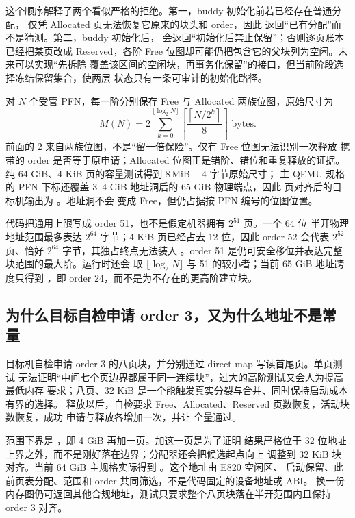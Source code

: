 这个顺序解释了两个看似严格的拒绝。第一，buddy 初始化前若已经存在普通分配，
仅凭 Allocated 页无法恢复它原来的块头和 order，因此
 返回“已有分配”而不是猜测。第二，buddy 初始化后，
 会返回“初始化后禁止保留”；否则逐页账本已经把某页改成
Reserved，各阶 Free 位图却可能仍把包含它的父块列为空闲。未来可以实现“先拆除
覆盖该区间的空闲块，再事务化保留”的接口，但当前阶段选择冻结保留集合，使两层
状态只有一条可审计的初始化路径。

对 \(N\) 个受管 PFN，每一阶分别保存 Free 与 Allocated 两族位图，原始尺寸为
\[
  M(N)=2\sum_{k=0}^{\lfloor\log_2N\rfloor}
  \left\lceil\frac{\left\lceil N/2^k\right\rceil}{8}\right\rceil
  \text{ bytes}.
\]
前面的 2 来自两族位图，不是“留一倍保险”。仅有 Free 位图无法识别一次释放
携带的 order 是否等于原申请；Allocated 位图正是错阶、错位和重复释放的证据。
纯 64 GiB、4 KiB 页的容量测试得到 \(8\,\mathrm{MiB}+4\) 字节原始尺寸；
主 QEMU 规格的 PFN 下标还覆盖 3--4 GiB 地址洞后的 65 GiB 物理端点，因此
页对齐后的目标机输出为 。地址洞不会
变成 Free，但仍占据按 PFN 编号的位图位置。

代码把通用上限写成 order 51，也不是假定机器拥有 \(2^{51}\) 页。一个 64 位
半开物理地址范围最多表达 \(2^{64}\) 字节；4 KiB 页已经占去 12 位，因此
order 52 会代表 \(2^{52}\) 页、恰好 \(2^{64}\) 字节，其独占终点无法装入
。order 51 是仍可安全移位并表达完整块范围的最大阶。运行时还会
取 \(\lfloor\log_2N\rfloor\) 与 51 的较小者；当前 65 GiB 地址跨度只得到
，即 order 24，而不是为不存在的更高阶建立块。

\subsection{为什么目标自检申请 order 3，又为什么地址不是常量}

目标机自检申请 order 3 的八页块，并分别通过 direct map 写读首尾页。单页测试
无法证明“中间七个页边界都属于同一连续块”，过大的高阶测试又会人为提高最低内存
要求；八页、32 KiB 是一个能触发真实分裂与合并、同时保持启动成本有界的选择。
释放以后，自检要求 Free、Allocated、Reserved 页数恢复，活动块数恢复，成功
申请与释放各增加一次，并让  全量通过。

范围下界是 ，即 4 GiB 再加一页。加这一页是为了证明
结果严格位于 32 位地址上界之外，而不是刚好落在边界；分配器还会把候选起点向上
调整到 32 KiB 块对齐。当前 64 GiB 主规格实际得到
。这个地址由 E820 空闲区、
启动保留、此前页表分配、范围和 order 共同筛选，不是代码固定的设备地址或 ABI。
换一份内存图仍可返回其他合规地址，测试只要求整个八页块落在半开范围内且保持
order 3 对齐。

